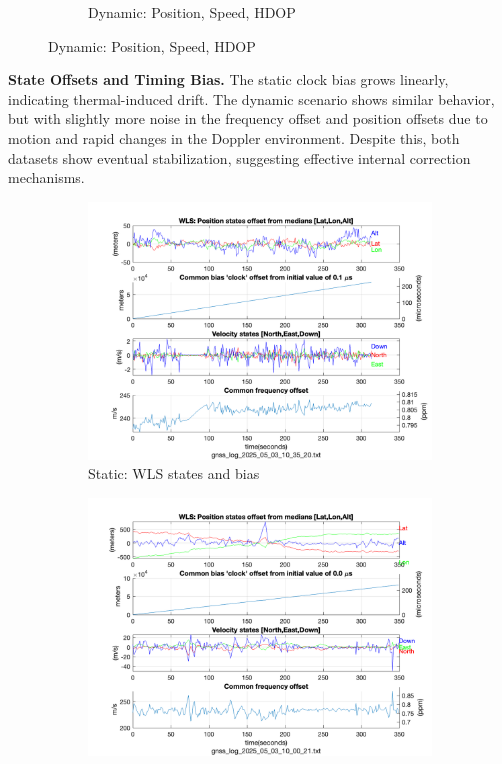 \begin{figure}[h!]
\begin{subfigure}{0.23\textwidth}
                \caption{Dynamic: Position, Speed, HDOP}
            \end{subfigure}
        \end{figure}
    
        \vspace{0.5em}
        \textbf{State Offsets and Timing Bias.} 
        The static clock bias grows linearly, indicating thermal-induced drift. The dynamic scenario shows similar behavior, but with slightly more noise in the frequency offset and position offsets due to motion and rapid changes in the Doppler environment. Despite this, both datasets show eventual stabilization, suggesting effective internal correction mechanisms.
    
        \begin{figure}[h!]
            \centering
            \begin{subfigure}{0.23\textwidth}
                \includegraphics[width=\textwidth]{images/Monte_Cappuccini/filtered/Samsung_A51_Monte_Cappuccini_fig5.png}
                \caption{Static: WLS states and bias}
            \end{subfigure}
            \hfill
            \begin{subfigure}{0.23\textwidth}
                \includegraphics[width=\textwidth]{images/Tram_15_trip_Castello_to_Pescatore/filtered/Samsung_A51_Tram_15_trip_Castello_to_Pescatore_fig5.png}

\end{subfigure}
\end{figure}
